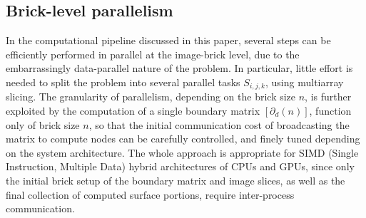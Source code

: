 %
%
%
%


\subsection{Brick-level parallelism}\label{sec:brick-parallelism}
In the computational pipeline discussed in this paper, several steps can be efficiently performed in parallel at the image-brick level, due to the embarrassingly data-parallel nature of the problem. In particular, little effort is needed to split the problem into several  parallel tasks $S_{i,j,k}$, using multiarray slicing. The granularity of parallelism, depending on the brick size $n$, is further exploited by the computation of a single boundary matrix $[\partial_d(n)]$, function only of brick size $n$, so that the initial communication cost of broadcasting the matrix to compute nodes can be carefully controlled, and finely tuned depending on the system architecture. The whole approach is appropriate  for SIMD (Single Instruction, Multiple Data) hybrid architectures of CPUs and GPUs, since only the initial brick setup of the boundary matrix and image slices, as well as the final collection of computed surface portions, require inter-process communication.